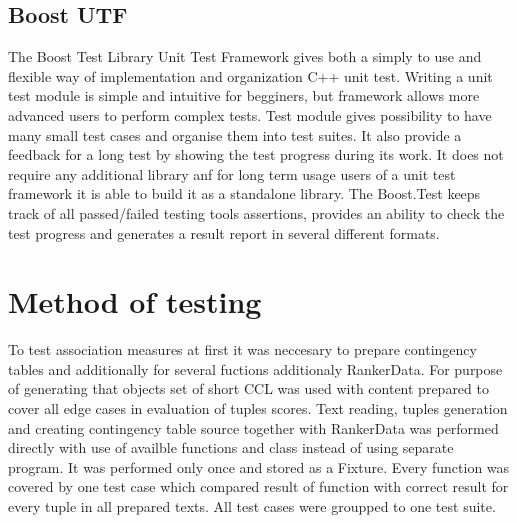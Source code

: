 \subsection{Boost UTF}\label{test_boost}
The Boost Test Library Unit Test Framework gives both a simply to use and flexible way of implementation and organization C++ unit test. 
Writing a unit test module is simple and intuitive for begginers, but framework allows more advanced users to perform complex tests. 
Test module gives possibility to have many small test cases and organise them into test suites. It also provide a feedback for a long test by 
showing the test progress during its work. It does not require any additional library anf for long term usage users of a unit test framework 
it is able to build it as a standalone library. The Boost.Test keeps track of all passed/failed testing tools assertions, 
provides an ability to check the test progress and generates a result report in several different formats.

\section{Method of testing}
To test association measures at first it was neccesary to prepare contingency tables and additionally for several fuctions additionaly RankerData. 
For purpose of generating that objects set of short CCL was used with content prepared to cover all edge cases in evaluation of tuples scores. 
Text reading, tuples generation and creating contingency table source together with RankerData was performed directly with use of availble functions 
and class instead of using separate program. It was performed only once and stored as a Fixture. Every function was covered by one test case which 
compared result of function with correct result for every tuple in all prepared texts. All test cases were groupped to one test suite.

